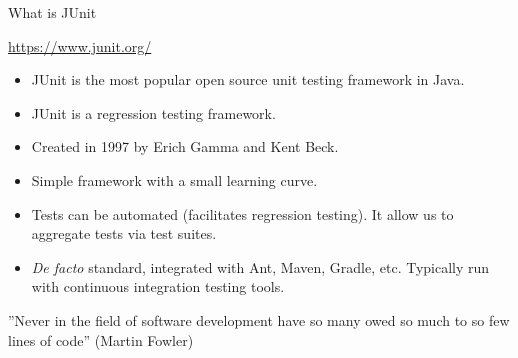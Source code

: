 \documentclass[11pt, xcolor=svgnames]{beamer}
\begin{document}
\begin{frame}{What is JUnit}

\begin{block}{}
  \centering \url{https://www.junit.org/}
\end{block}

\begin{itemize}
    \item JUnit is the most popular open source unit testing framework in Java.
    \item JUnit is a regression testing framework.
    \item Created in 1997 by Erich Gamma and Kent Beck.
    \item Simple framework with a small learning curve.
    \item Tests can be automated (facilitates regression testing). It allow us to aggregate tests via test suites.
    \item \textit{De facto} standard, integrated with Ant, Maven, Gradle, etc. Typically run with continuous integration testing tools. 
\end{itemize}




\begin{block}{}
  ''Never in the field of software development have so many owed so much to so few lines of code'' (Martin Fowler)
\end{block}

\end{frame}







\end{document}

